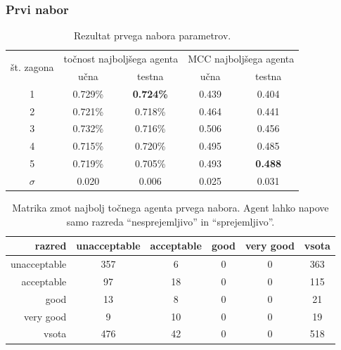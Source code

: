 \subsubsection{Prvi nabor}
\begin{table}[H]
    \caption{Rezultat prvega nabora parametrov.}
    \begin{center}
        \begin{tabular}{|| c | c c || c c ||}
            \hline
            \multirow{2}{*}{št. zagona} & \multicolumn{2}{c||}{točnost najboljšega agenta} & \multicolumn{2}{c||}{MCC najboljšega agenta} \\ \cline{2-5}
            & učna    & testna           & učna  & testna         \\
            \hline
            1        & 0.729\% & \textbf{0.724\%} & 0.439 & 0.404          \\
            \hline
            2        & 0.721\% & 0.718\%          & 0.464 & 0.441          \\
            \hline
            3        & 0.732\% & 0.716\%          & 0.506 & 0.456          \\
            \hline
            4        & 0.715\% & 0.720\%          & 0.495 & 0.485          \\
            \hline
            5        & 0.719\% & 0.705\%          & 0.493 & \textbf{0.488} \\
            \hline
            $\sigma$ & 0.020   & 0.006            & 0.025 & 0.031          \\
            \hline
        \end{tabular}
    \end{center}
    \label{tab:car_result_1}
\end{table}

\begin{table}[H]
    \centering
    \caption{Matrika zmot najbolj točnega agenta prvega nabora. Agent lahko napove samo razreda \enquote{nesprejemljivo} in \enquote{sprejemljivo}.}
    \begin{tabular}{||rccccc||}
        \hline
        razred       & unacceptable & acceptable & good & very good & vsota \\ \hline
        unacceptable & 357          & 6          & 0    & 0         & 363   \\ \hline
        acceptable   & 97           & 18         & 0    & 0         & 115   \\ \hline
        good         & 13           & 8          & 0    & 0         & 21    \\ \hline
        very good    & 9            & 10         & 0    & 0         & 19    \\ \hline
        vsota        & 476          & 42         & 0    & 0         & 518   \\ \hline
    \end{tabular}
    \label{tab:car_acc_1}
\end{table}

